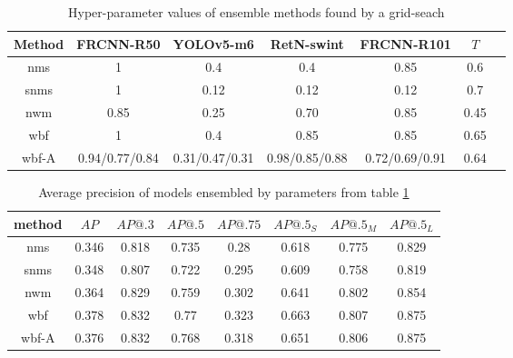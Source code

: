 \begin{table}[h]
    \begin{tabular}{|c|c|c|c|c|c|c|}
        \hline
        Method & FRCNN-R50      & YOLOv5-m6      & RetN-swint     & FRCNN-R101     & $T$  \\ \hline
        nms    & 1              & 0.4            & 0.4            & 0.85           & 0.6  \\ \hline
        snms   & 1              & 0.12           & 0.12           & 0.12           & 0.7  \\ \hline
        nwm    & 0.85           & 0.25           & 0.70           & 0.85           & 0.45 \\ \hline
        wbf    & 1              & 0.4            & 0.85           & 0.85           & 0.65 \\ \hline
        wbf-A  & 0.94/0.77/0.84 & 0.31/0.47/0.31 & 0.98/0.85/0.88 & 0.72/0.69/0.91 & 0.64 \\ \hline
    \end{tabular}
    \caption{Hyper-parameter values of ensemble methods found by a grid-seach}
    \label{tab:ensemble_params:grid_search}
\end{table}


\begin{table}[h]
    \centering
    \begin{tabular}{|c|c|c|c|c|c|c|c|}
        \hline
        method & $AP$  & $AP@.3$ & $AP@.5$ & $AP@.75$ & $AP@.5_S$ & $AP@.5_M$ & $AP@.5_L$ \\ \hline
        nms    & 0.346 & 0.818   & 0.735   & 0.28     & 0.618     & 0.775     & 0.829     \\ \hline
        snms   & 0.348 & 0.807   & 0.722   & 0.295    & 0.609     & 0.758     & 0.819     \\ \hline
        nwm    & 0.364 & 0.829   & 0.759   & 0.302    & 0.641     & 0.802     & 0.854     \\ \hline
        wbf    & 0.378 & 0.832   & 0.77    & 0.323    & 0.663     & 0.807     & 0.875     \\ \hline
        wbf-A  & 0.376 & 0.832   & 0.768   & 0.318    & 0.651     & 0.806     & 0.875     \\ \hline
    \end{tabular}
    \caption{Average precision of models ensembled by parameters from table \ref{tab:ensemble_params:grid_search}}
    \label{tab:precision:grid_search}
\end{table}



